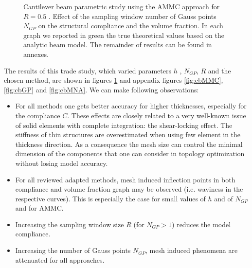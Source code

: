 \begin{figure}[!ht]
\centering
    \caption{Cantilever beam parametric study using the AMMC approach for $R=0.5$ . Effect of the sampling window number of Gauss points $N_{GP}$ on the structural compliance and the volume fraction. In each graph we reported in green the true theoretical values based on the analytic beam model. The remainder of results can be found in annexes.}%
    \label{fig:cbMMCtext}%
\end{figure}
The results of this trade study, which varied parameters $h$ , $N_{GP}$, $R$ and the chosen method, are shown in figures \ref{fig:cbMMCtext} and appendix figures \ref{fig:cbMMC},\ref{fig:cbGP} and \ref{fig:cbMNA}. We can make following observations:
\begin{itemize}
\item For all methods one gets better accuracy for higher thicknesses, especially for the compliance $C$. These effects are closely related to a very well-known issue of solid elements with complete integration: the shear-locking effect. The stiffness of thin structures are overestimated when using few element in the thickness direction. As a consequence the mesh size can control the minimal dimension of the components that one can consider in topology optimization without losing model accuracy.
\item For all reviewed adapted methods, mesh induced inflection points in both compliance and volume fraction graph may be observed (i.e. waviness in the respective curves). This is especially the case for small values of $h$ and of $N_{GP}$ and for AMMC. 
\item Increasing the sampling window size $R$ (for $N_{GP}>1$) reduces the model compliance.
\item Increasing the number of Gauss points $N_{GP}$, mesh induced phenomena are attenuated for all approaches. 
\end{itemize}
